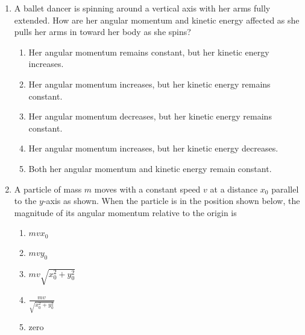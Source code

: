 \documentclass{../../../oss-apphys}
\begin{document}
\begin{multicols*}{2}
\begin{enumerate}[leftmargin=18pt]
  \item A ballet dancer is spinning around a vertical axis with her arms fully
    extended. How are her angular momentum and kinetic energy affected
    as she pulls her arms in toward her body as she spins?
    \begin{enumerate}[noitemsep,topsep=0pt,leftmargin=18pt,label=(\Alph*)]
    \item Her angular momentum remains constant, but her kinetic energy
      increases.
    \item Her angular momentum increases, but her kinetic energy remains
      constant.
    \item Her angular momentum decreases, but her kinetic energy remains
      constant.
    \item Her angular momentum increases, but her kinetic energy decreases.
    \item Both her angular momentum and kinetic energy remain constant.
    \end{enumerate}
    
  \item A particle of mass $m$ moves with a constant speed $v$ at a distance
    $x_0$ parallel to the $y$-axis as shown. When the particle is in the
    position shown below, the magnitude of its angular momentum relative to the
    origin is
    \begin{center}
    \end{center}
    \begin{enumerate}[itemsep=4pt,topsep=0pt,leftmargin=18pt,label=(\Alph*)]
    \item $mvx_0$
    \item $mvy_0$
    \item $mv\sqrt{x_0^2+y_0^2}$
    \item $\displaystyle\frac{mv}{\sqrt{x_0^2+y_0^2}}$
    \item zero
    \end{enumerate}
    \columnbreak
    

\end{enumerate}
\end{multicols*}
\end{document}
